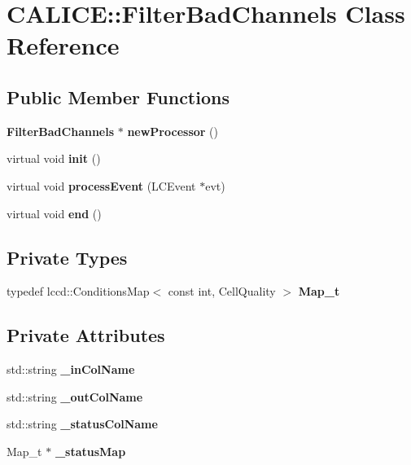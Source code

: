 \section{CALICE::FilterBadChannels Class Reference}
\label{classCALICE_1_1FilterBadChannels}
\subsection*{Public Member Functions}
\begin{DoxyCompactItemize}
\item 
{\bf FilterBadChannels} $\ast$ {\bfseries newProcessor} ()\label{classCALICE_1_1FilterBadChannels_a06ad29f11701e24e64b82daa9b36b4ba}

\item 
virtual void {\bfseries init} ()\label{classCALICE_1_1FilterBadChannels_ad75699cb8a346a1dcf712a5c4a8709d9}

\item 
virtual void {\bfseries processEvent} (LCEvent $\ast$evt)\label{classCALICE_1_1FilterBadChannels_a96a8e4be917781a9f4612e44ad4f61c3}

\item 
virtual void {\bfseries end} ()\label{classCALICE_1_1FilterBadChannels_ac6a5d35d02c2b6c7dcd81a4c37126b2d}

\end{DoxyCompactItemize}
\subsection*{Private Types}
\begin{DoxyCompactItemize}
\item 
typedef lccd::ConditionsMap$<$ const int, CellQuality $>$ {\bfseries Map\_\-t}\label{classCALICE_1_1FilterBadChannels_ac0393be0651c887dd3b47a40e186ddfa}

\end{DoxyCompactItemize}
\subsection*{Private Attributes}
\begin{DoxyCompactItemize}
\item 
std::string {\bfseries \_\-inColName}\label{classCALICE_1_1FilterBadChannels_a7febc615df3c8f9df80b96a3a23e629d}

\item 
std::string {\bfseries \_\-outColName}\label{classCALICE_1_1FilterBadChannels_af44ac7aeffb09195d2dc225ce3ce903b}

\item 
std::string {\bfseries \_\-statusColName}\label{classCALICE_1_1FilterBadChannels_a011f53f4dda0d7dbc98bf73579d05c95}

\item 
Map\_\-t $\ast$ {\bfseries \_\-statusMap}\label{classCALICE_1_1FilterBadChannels_aa6be96b02055f381369ec71ab5d989fd}

\end{DoxyCompactItemize}


